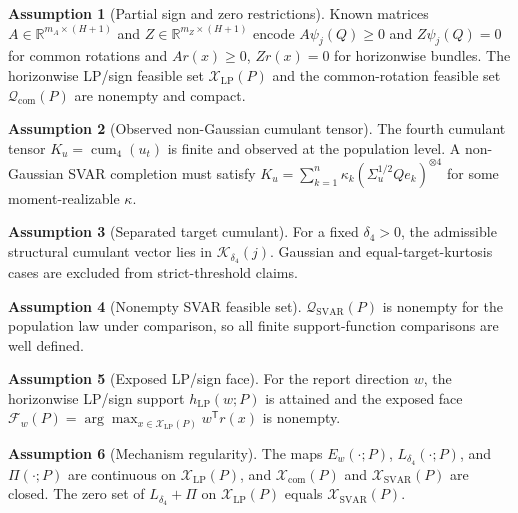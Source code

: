 \documentclass[11pt]{article}
\newcommand{\transpose}{\mathsf{T}}
\newcommand{\R}{\mathbb{R}}
\theoremstyle{definition}
\newtheorem{assumption}{Assumption}
\theoremstyle{plain}
\theoremstyle{remark}
\begin{document}
\begin{assumption}[Partial sign and zero restrictions]\label{ass:sign-zero}
Known matrices \(A\in\R^{m_A\times(H+1)}\) and \(Z\in\R^{m_Z\times(H+1)}\) encode \(A\psi_j(Q)\ge0\) and \(Z\psi_j(Q)=0\) for common rotations and \(Ar(x)\ge0\), \(Zr(x)=0\) for horizonwise bundles.  The horizonwise LP/sign feasible set \(\mathcal X_{\mathrm{LP}}(P)\) and the common-rotation feasible set \(\mathcal Q_{\mathrm{com}}(P)\) are nonempty and compact.
\end{assumption}

\begin{assumption}[Observed non-Gaussian cumulant tensor]\label{ass:cumulant-tensor}
The fourth cumulant tensor \(K_u=\operatorname{cum}_4(u_t)\) is finite and observed at the population level.  A non-Gaussian SVAR completion must satisfy \(K_u=\sum_{k=1}^n\kappa_k(\Sigma_u^{1/2}Qe_k)^{\otimes4}\) for some moment-realizable \(\kappa\).
\end{assumption}

\begin{assumption}[Separated target cumulant]\label{ass:bounded-gap}
For a fixed \(\delta_4>0\), the admissible structural cumulant vector lies in \(\mathcal K_{\delta_4}(j)\).  Gaussian and equal-target-kurtosis cases are excluded from strict-threshold claims.
\end{assumption}

\begin{assumption}[Nonempty SVAR feasible set]\label{ass:svar-nonempty}
\(\mathcal Q_{\mathrm{SVAR}}(P)\) is nonempty for the population law under comparison, so all finite support-function comparisons are well defined.
\end{assumption}

\begin{assumption}[Exposed LP/sign face]\label{ass:exposed-face}
For the report direction \(w\), the horizonwise LP/sign support \(h_{\mathrm{LP}}(w;P)\) is attained and the exposed face \(\mathcal F_w(P)=\arg\max_{x\in\mathcal X_{\mathrm{LP}}(P)}w^\transpose r(x)\) is nonempty.
\end{assumption}

\begin{assumption}[Mechanism regularity]\label{ass:mechanism-regularity}
The maps \(E_w(\cdot;P)\), \(L_{\delta_4}(\cdot;P)\), and \(\Pi(\cdot;P)\) are continuous on \(\mathcal X_{\mathrm{LP}}(P)\), and \(\mathcal X_{\mathrm{com}}(P)\) and \(\mathcal X_{\mathrm{SVAR}}(P)\) are closed.  The zero set of \(L_{\delta_4}+\Pi\) on \(\mathcal X_{\mathrm{LP}}(P)\) equals \(\mathcal X_{\mathrm{SVAR}}(P)\).
\end{assumption}
\end{document}
